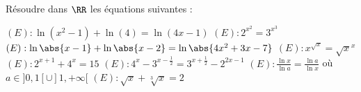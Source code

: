 %
%
	Résoudre dans $\RR$ les équations suivantes :
		\begin{tasks}
		\task $(E): \ln(x^2-1)+\ln(4)=\ln(4x-1)$
		\task $(E): 2^{x^2}=3^{x^3}$
		\task $(E): \ln \abs{x-1} + \ln \abs{x-2} = \ln \abs{4x^2 + 3x-7}$
		\task $(E): x^{\sqrt{x}}=\sqrt{x}^x$
	    \task $(E): 2^{x+1}+4^x = 15$
		\task $(E): 4^x - 3^{x-\frac{1}{2}} = 3^{x+\frac{1}{2}} -2^{2x-1}$
		\task $(E): \frac{\ln x}{\ln a} =\frac{\ln a}{\ln x}$ où $a\in ]0,1[\cup]1, +\infty[$
		\task $(E) : \sqrt{x} + \sqrt[3]{x}=2$
		\end{tasks}
